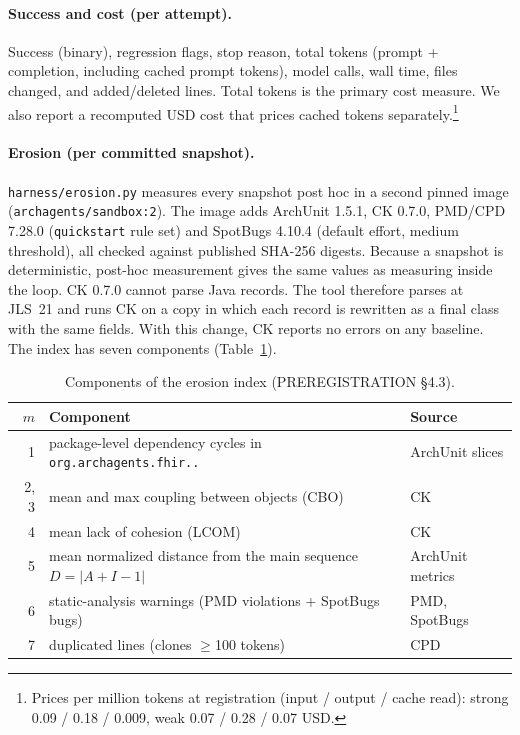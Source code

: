 \documentclass[10pt]{article}
\newcommand{\code}[1]{\texttt{#1}}
\begin{document}
\paragraph{Success and cost (per attempt).} Success (binary), regression flags, stop reason, total
tokens (prompt + completion, including cached prompt tokens), model calls, wall time, files
changed, and added/deleted lines. Total tokens is the primary cost measure. We also report a
recomputed USD cost that prices cached tokens separately.\footnote{Prices per million tokens at
registration (input / output / cache read): strong 0.09 / 0.18 / 0.009, weak 0.07 / 0.28 / 0.07 USD.}

\paragraph{Erosion (per committed snapshot).} \code{harness/erosion.py} measures every snapshot
post hoc in a second pinned image (\code{archagents/sandbox:2}). The image adds ArchUnit 1.5.1, CK
0.7.0, PMD/CPD 7.28.0 (\code{quickstart} rule set) and SpotBugs 4.10.4 (default effort, medium
threshold), all checked against published SHA-256 digests. Because a snapshot is deterministic,
post-hoc measurement gives the same values as measuring inside the loop. CK 0.7.0 cannot parse
Java records. The tool therefore parses at JLS~21 and runs CK on a copy in which each record is
rewritten as a final class with the same fields. With this change, CK reports no errors on any
baseline. The index has seven components (Table~\ref{tab:erosion}).

\begin{table}[tbp]\centering
\caption{Components of the erosion index (PREREGISTRATION \S4.3).}
\label{tab:erosion}
\small
\begin{tabular}{@{}rll@{}}
\toprule
$m$ & Component & Source\\
\midrule
1 & package-level dependency cycles in \code{org.archagents.fhir..} & ArchUnit slices\\
2, 3 & mean and max coupling between objects (CBO) & CK\\
4 & mean lack of cohesion (LCOM) & CK\\
5 & mean normalized distance from the main sequence $D=|A+I-1|$ & ArchUnit metrics\\
6 & static-analysis warnings (PMD violations + SpotBugs bugs) & PMD, SpotBugs\\
7 & duplicated lines (clones $\ge$100 tokens) & CPD\\
\bottomrule
\end{tabular}
\end{table}
\end{document}
